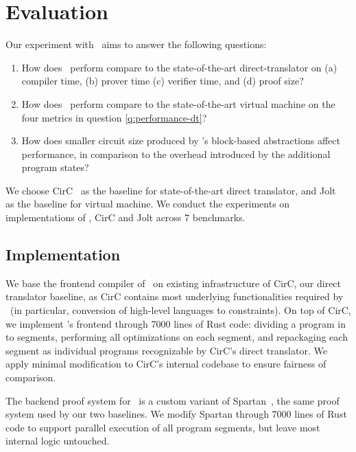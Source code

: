 \section{Evaluation}

Our experiment with \CoBBl~aims to answer the following questions:
\begin{enumerate}
  \item How does \CoBBl~perform compare to the state-of-the-art direct-translator on (a) compiler time, (b) prover time (c) verifier time, and (d) proof size?\label{q:performance-dt}
  \item How does \CoBBl~perform compare to the state-of-the-art virtual machine on the four metrics in question \ref{q:performance-dt}?\label{q:performance-vm}
  \item How does smaller circuit size produced by \CoBBl's block-based abstractions affect performance, in comparison to the overhead introduced by the additional program states?\label{q:tradeoff}
\end{enumerate}

We choose CirC~\cite{ozdemir20circ} as the baseline for state-of-the-art direct translator, and Jolt~\cite{arun23jolt} as the baseline for virtual machine.  We conduct the experiments on implementations of \CoBBl, CirC and Jolt across 7 benchmarks.

\subsection{Implementation}
 We base the frontend compiler of \CoBBl~on existing infrastructure of CirC, our direct translator baseline, as CirC contains most underlying functionalities required by \CoBBl~(in particular, conversion of high-level languages to constraints). On top of CirC, we implement \CoBBl's frontend through 7000 lines of Rust code: dividing a program in to segments, performing all optimizations on each segment, and repackaging each segment as individual programs recognizable by CirC's direct translator. We apply minimal modification to CirC's internal codebase to ensure fairness of comparison.

The backend proof system for \CoBBl~is a custom variant of Spartan~\cite{setty19spartan}, the same proof system used by our two baselines. We modify Spartan through 7000 lines of Rust code to support parallel execution of all program segments, but leave most internal logic untouched.

